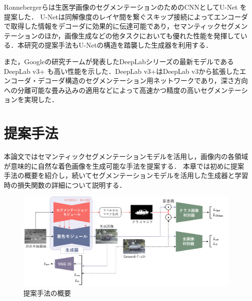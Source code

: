 \documentclass[11pt,dvipdfmx]{ujreport}
\begin{document}
Ronnebergerらは生医学画像のセグメンテーションのためのCNNとしてU-Net \cite{Ronnenberger_2015_MICCAI_UNet} を提案した．
U-Netは同解像度のレイヤ間を繋ぐスキップ接続によってエンコーダで取得した情報をデコーダに効果的に伝達可能であり，セマンティックセグメンテーションのほか，画像生成などの他タスクにおいても優れた性能を発揮している．本研究の提案手法もU-Netの構造を踏襲した生成器を利用する．\par

また，Googleの研究チームが発表したDeepLabシリーズの最新モデルであるDeepLab v3+ \cite{Chen_2018_ECCV_DeepLabv3plus} も高い性能を示した．DeepLab v3+はDeepLab v3から拡張したエンコーダ・デコーダ構造のセグメンテーション用ネットワークであり，深さ方向への分離可能な畳み込みの適用などによって高速かつ精度の高いセグメンテーションを実現した．




\chapter{提案手法}

\label{sec:proposed_method}

本論文ではセマンティックセグメンテーションモデルを活用し，画像内の各領域が意味的に自然な着色画像を生成可能な手法を提案する．
本章では初めに提案手法の概要を紹介し，続いてセグメンテーションモデルを活用した生成器と学習時の損失関数の詳細について説明する．

\begin{figure}[tb]
    \centering
    \includegraphics[clip, width=1\columnwidth]{images/overall_architecture-jp_20240114.pdf}
    \caption{提案手法の概要}
    \label{fig:overall_architecture}
\end{figure}
\end{document}
